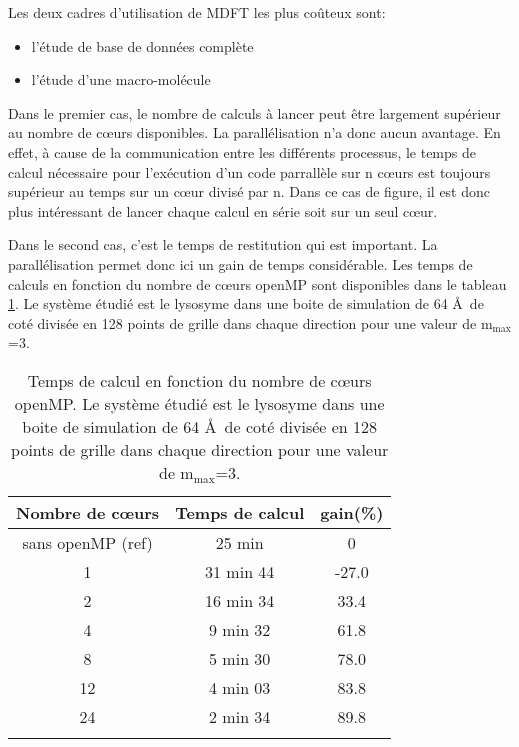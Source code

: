Les deux cadres d'utilisation de MDFT les plus coûteux sont:
\begin{itemize}
\item l'étude de base de données complète
\item l'étude d'une macro-molécule
\end{itemize}

Dans le premier cas, le nombre de calculs à lancer peut être largement supérieur au nombre de cœurs disponibles. La parallélisation n'a donc aucun avantage. En effet, à cause de la communication entre les différents processus, le temps de calcul nécessaire pour l’exécution d'un code parrallèle sur n cœurs est toujours supérieur au temps sur un cœur divisé par n. Dans ce cas de figure, il est donc plus intéressant de lancer chaque calcul en série soit sur un seul cœur.

Dans le second cas, c'est le temps de restitution qui est important. La parallélisation permet donc ici un gain de temps considérable. Les temps de calculs en fonction du nombre de cœurs openMP sont disponibles dans le tableau \ref{tab:perf_minimiseurs}. Le système étudié est le lysosyme dans une boite de simulation de 64 \AA\ de coté divisée en 128 points de grille dans chaque direction pour une valeur de $\mathrm{m}_\mathrm{max}$=3.



\begin{table}[H]
 \centering
  \begin{tabular}{ c | c | c }
      Nombre de cœurs & Temps de calcul & gain(\%)\\
    \hline
    sans openMP (ref) & 25 min & 0\\
     1 & 31 min 44 & -27.0 \\
     2 & 16 min 34 &  33.4 \\
     4 &  9 min 32 &  61.8 \\
     8 &  5 min 30 &  78.0 \\
    12 &  4 min 03 &  83.8 \\
    24 &  2 min 34 &  89.8 \\
    \hline \multicolumn{3}{c}{} \\[-1em]\hline
  \end{tabular}
  \caption[Temps de calcul en fonction du nombre de cœurs openMP.]{Temps de calcul en fonction du nombre de cœurs openMP. Le système étudié est le lysosyme dans une boite de simulation de 64 \AA\ de coté divisée en 128 points de grille dans chaque direction pour une valeur de $\mathrm{m}_\mathrm{max}$=3.}
  \label{tab:perf_minimiseurs}  
\end{table}


